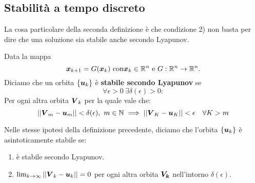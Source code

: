 \subsection{Stabilità a tempo discreto}%
\label{sub:Stabilità a tempo discreto}
La cosa particolare della seconda definizione è che condizione 2) non basta per dire che una soluzione sia stabile anche secondo Lyapunov.
\begin{defn}
    Data la mappa
    \[
	\boldsymbol{x}_{k+1}=G(\boldsymbol{x}_k) \ \text{con} \boldsymbol{x}_k \in \mathbb{R}^n \ \text{e } G: \mathbb{R}^n\to \mathbb{R}^n.
    \] 
    Diciamo che un orbita $\left\{\boldsymbol{u}_k\right\}$ è \textbf{stabile secondo Lyapunov} se 
    \[
	\forall \epsilon > 0 \ \exists \delta (\epsilon)>0:
    \] 
    Per ogni altra orbita $\boldsymbol{V}_k$ per la quale vale che:
    \[
	\left|\left|\boldsymbol{V}_m - \boldsymbol{u}_m\right|\right|< \delta (\epsilon), \ m \in \mathbb{N} \implies 
        \left|\left|\boldsymbol{V}_K - \boldsymbol{u}_K\right|\right|<\epsilon \quad \forall K > m
    \]
\end{defn}
\noindent
\begin{defn}

    Nelle stesse ipotesi della definizione precedente, diciamo che l'orbita $\left\{\boldsymbol{u}_k\right\}$ è asintoticamente stabile se:
    \begin{enumerate}
        \item è stabile secondo Lyapunov.
	\item $\lim_{k \to \infty} \left|\left|\boldsymbol{V}_k-\boldsymbol{u}_k\right|\right|=0$ per ogni altra orbita $\boldsymbol{V_k}$ nell'intorno $\delta (\epsilon)$.
    \end{enumerate}
\end{defn}
\noindent
